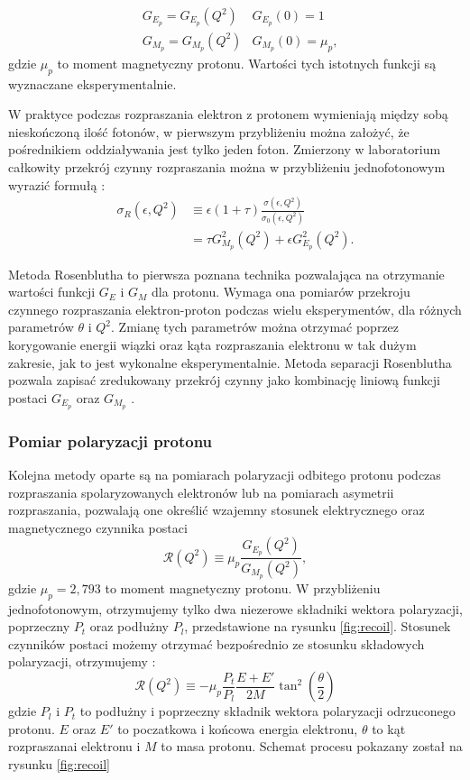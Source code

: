 \documentclass[11pt]{book}
\theoremstyle{definition}
\begin{document}
\begin{eqnarray*}
 &G_{E_p} = G_{E_p}(Q^2)  &G_{E_p}(0) = 1\\
 &G_{M_p} = G_{M_p}(Q^2)  &G_{M_p}(0) = \mu_p, 
\end{eqnarray*}
gdzie $\mu_p$ to moment magnetyczny protonu. Wartości tych istotnych funkcji są wyznaczane eksperymentalnie. 

W praktyce podczas rozpraszania elektron z protonem wymieniają między sobą nieskończoną ilość fotonów, w pierwszym przybliżeniu można założyć, że pośrednikiem oddziaływania jest tylko jeden foton. Zmierzony w laboratorium całkowity przekrój czynny rozpraszania można w przybliżeniu jednofotonowym wyrazić formułą \cite{2009PhRvC..79f5204A}:
% 
\begin{equation}
\begin{split}
\sigma_R(\epsilon, Q^2) &\equiv \epsilon \left(1 + \tau \right) \frac{\sigma \left(\epsilon,Q^2\right)}{\sigma_0\left(\epsilon, Q^2\right) }\\
&=\tau G_{M_p}^2(Q^2) + \epsilon G_{E_p}^2(Q^2).
\end{split} \label{eq:rosen}
\end{equation}

Metoda Rosenblutha to pierwsza poznana technika pozwalająca na otrzymanie wartości funkcji $G_E$ i $G_M$ dla protonu. Wymaga ona pomiarów przekroju czynnego rozpraszania elektron-proton podczas wielu eksperymentów, dla różnych parametrów $\theta$ i $Q^2$. Zmianę tych parametrów można otrzymać poprzez korygowanie energii wiązki oraz kąta rozpraszania elektronu w tak dużym zakresie, jak to jest wykonalne eksperymentalnie. Metoda separacji Rosenblutha pozwala zapisać zredukowany przekrój czynny jako kombinację liniową funkcji postaci $G_{E_p}$ oraz $G_{M_p}$ \cite{2007PrPNP..59..694P}.
%

\subsubsection{Pomiar polaryzacji protonu}

Kolejna metody oparte są na pomiarach polaryzacji odbitego protonu podczas rozpraszania spolaryzowanych elektronów lub na pomiarach asymetrii rozpraszania, pozwalają one określić wzajemny stosunek elektrycznego oraz magnetycznego czynnika postaci
%
$$
\mathcal{R}\left(Q^2\right) \equiv \mu_p \frac{G_{E_p}\left(Q^2\right)}{G_{M_p}\left(Q^2\right)},
$$
gdzie $\mu_p = 2,793$ to moment magnetyczny protonu. W przybliżeniu jednofotonowym, otrzymujemy tylko dwa niezerowe składniki wektora polaryzacji, poprzeczny $P_t$ oraz podłużny $P_l$, przedstawione na rysunku \ref{fig:recoil}. Stosunek czynników postaci możemy otrzymać bezpośrednio ze stosunku składowych polaryzacji, otrzymujemy \cite{2007PrPNP..59..694P}:
%
$$
\mathcal{R}\left(Q^2\right) \equiv -\mu_p  \frac{P_t}{P_l} \frac{E + E'}{2M} \tan^2  \left(\frac{\theta}{2}\right) 
$$
%
gdzie $P_l$ i $P_t$ to podłużny i poprzeczny składnik wektora polaryzacji odrzuconego protonu. $E$ oraz $E'$ to poczatkowa i końcowa energia elektronu, $\theta$ to kąt rozpraszanai elektronu i $M$ to masa protonu. Schemat procesu pokazany został na rysunku \ref{fig:recoil}
%
\end{document}
